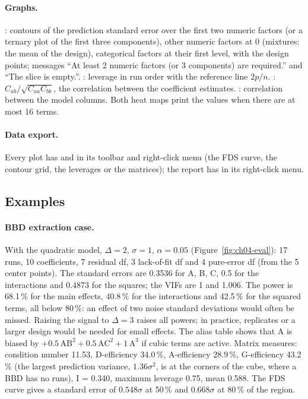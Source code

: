 \paragraph{Graphs.} : contours of the prediction standard error over the first two
numeric factors (or a ternary plot of the first three components), other numeric factors at 0 (mixtures: the mean of
the design), categorical factors at their first level, with the design points; messages ``At least 2 numeric
factors (or 3 components) are required.'' and ``The slice is empty.''. : leverage in run order
with the reference line $2p/n$. : $C_{ab}/\sqrt{C_{aa}C_{bb}}$, the correlation
between the coefficient estimates. : correlation between the model columns. Both heat
maps print the values when there are at most 16 terms.

\paragraph{Data export.} Every plot has  and  in its toolbar and right-click menu
(the FDS curve, the contour grid, the leverages or the matrices); the report has  in its
right-click menu.

\subsection{Examples}
\paragraph{BBD extraction case.} With the quadratic model, $\Delta = 2$, $\sigma = 1$, $\alpha = 0.05$
(Figure~\ref{fig:ch04-eval}): 17 runs, 10 coefficients, 7 residual df, 3 lack-of-fit df and 4 pure-error df (from
the 5 center points). The standard errors are 0.3536 for A, B, C, 0.5 for the interactions and 0.4873 for the
squares; the VIFs are 1 and 1.006. The power is 68.1\,\% for the main effects, 40.8\,\% for the interactions and
42.5\,\% for the squared terms, all below 80\,\%: an effect of two noise standard deviations would often be missed.
Raising the signal to $\Delta = 3$ raises all powers; in practice, replicates or a larger design would be needed for
small effects. The alias table shows that A is biased by $+0.5\,\text{AB}^2 + 0.5\,\text{AC}^2 + 1\,\text{A}^3$ if
cubic terms are active. Matrix measures: condition number 11.53, D-efficiency 34.0\,\%, A-efficiency 28.9\,\%,
G-efficiency 43.2\,\% (the largest prediction variance, $1.36\sigma^2$, is at the corners of the cube, where a BBD
has no runs), I = 0.340, maximum leverage 0.75, mean 0.588. The FDS curve gives a standard error of
$0.548\sigma$ at 50\,\% and $0.668\sigma$ at 80\,\% of the region.


